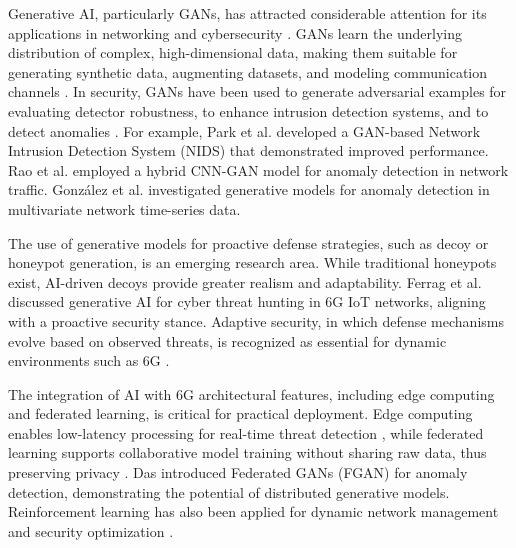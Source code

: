 \documentclass{article}
\begin{document}
Generative AI, particularly GANs, has attracted considerable attention for its applications in networking and cybersecurity \cite{Vu2024ApplicationsOGC, Ayanoglu2022MachineLIA, Arifin2024ASOF}. GANs learn the underlying distribution of complex, high-dimensional data, making them suitable for generating synthetic data, augmenting datasets, and modeling communication channels \cite{Wen2024GenerativeAFU, Tao2023WirelessNDZ, Zhang2023GenerativeAFS, Muhammad2024IntegratingGAAE}. In security, GANs have been used to generate adversarial examples for evaluating detector robustness, to enhance intrusion detection systems, and to detect anomalies \cite{Park2023AnEAD, Rao2024AIDAG, Gonzalez2020OnTUJ, Ferrag2023GenerativeAFB}. For example, Park et al. \cite{Park2023AnEAD} developed a GAN-based Network Intrusion Detection System (NIDS) that demonstrated improved performance. Rao et al. \cite{Rao2024AIDAG} employed a hybrid CNN-GAN model for anomaly detection in network traffic. Gonz\'{a}lez et al. \cite{Gonzalez2020OnTUJ} investigated generative models for anomaly detection in multivariate network time-series data.

The use of generative models for proactive defense strategies, such as decoy or honeypot generation, is an emerging research area. While traditional honeypots exist, AI-driven decoys provide greater realism and adaptability. Ferrag et al. \cite{Ferrag2023GenerativeAFB} discussed generative AI for cyber threat hunting in 6G IoT networks, aligning with a proactive security stance. Adaptive security, in which defense mechanisms evolve based on observed threats, is recognized as essential for dynamic environments such as 6G \cite{Shen2021AdaptiveADAC, Vemuri2024AdaptiveGAM}.

The integration of AI with 6G architectural features, including edge computing and federated learning, is critical for practical deployment. Edge computing enables low-latency processing for real-time threat detection \cite{Ferrag2023EdgeLFAD}, while federated learning supports collaborative model training without sharing raw data, thus preserving privacy \cite{Das2022FGANFGI}. Das \cite{Das2022FGANFGI} introduced Federated GANs (FGAN) for anomaly detection, demonstrating the potential of distributed generative models. Reinforcement learning has also been applied for dynamic network management and security optimization \cite{Shen2021AdaptiveADAC}.
\end{document}
